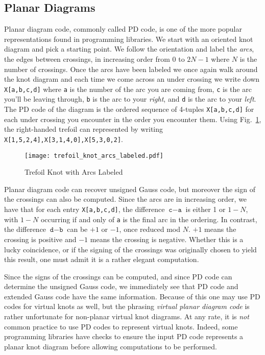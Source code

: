     \subsection{Planar Diagrams}
        Planar diagram code, commonly called PD code, is one of the more popular
        representations found in programming libraries. We start with an
        oriented knot diagram and pick a starting point. We follow the
        orientation and label the \textit{arcs}, the edges between crossings,
        in increasing order from $0$ to $2N-1$ where $N$ is the number of
        crossings. Once the arcs have been labeled we once again walk around
        the knot diagram and each time we come across an under crossing we write
        down \texttt{X[a,b,c,d]} where \texttt{a} is the number of the arc you
        are coming from, \texttt{c} is the arc you'll be leaving through,
        \texttt{b} is the arc to your \textit{right}, and \texttt{d} is the
        arc to your \textit{left}. The PD code of the diagram is the ordered
        sequence of 4-tuples \texttt{X[a,b,c,d]} for each under crossing you
        encounter in the order you encounter them. Using
        Fig.~\ref{fig:trefoil_knot_arcs_labeled}, the right-handed trefoil can
        represented by writing \texttt{X[1,5,2,4],X[3,1,4,0],X[5,3,0,2]}.
        \begin{figure}
            \centering
            \texttt{[image: trefoil\_knot\_arcs\_labeled.pdf]}
            \caption{Trefoil Knot with Arcs Labeled}
            \label{fig:trefoil_knot_arcs_labeled}
        \end{figure}
        \par\hfill\par
        Planar diagram code can recover unsigned Gauss code, but moreover
        the sign of the crossings can also be computed. Since the arcs are in
        increasing order, we have that for each entry
        \texttt{X[a,b,c,d]}, the difference $\texttt{c}-\texttt{a}$ is either
        1 or $1-N$, with $1-N$ occurring if and only of \texttt{a} is the final
        arc in the ordering. In contrast, the difference $\texttt{d}-\texttt{b}$
        can be $+1$ or $-1$, once reduced mod $N$. $+1$ means the crossing is
        positive and $-1$ means the crossing is negative. Whether this is a
        lucky coincidence, or if the signing of the crossings was originally
        chosen to yield this result, one must admit it is a rather elegant
        computation.
        \par\hfill\par
        Since the signs of the crossings can be computed, and since
        PD code can determine the unsigned Gauss code, we immediately see that
        PD code and extended Gauss code have the same information. Because of
        this one may use PD codes for virtual knots as well, but the phrasing
        \textit{virtual planar diagram code} is rather unfortunate for
        non-planar virtual knot diagrams. At any rate, it is \textit{not}
        common practice to use PD codes to represent virtual knots. Indeed,
        some programming libraries have checks to ensure the input PD code
        represents a planar knot diagram before allowing computations to be
        performed.

